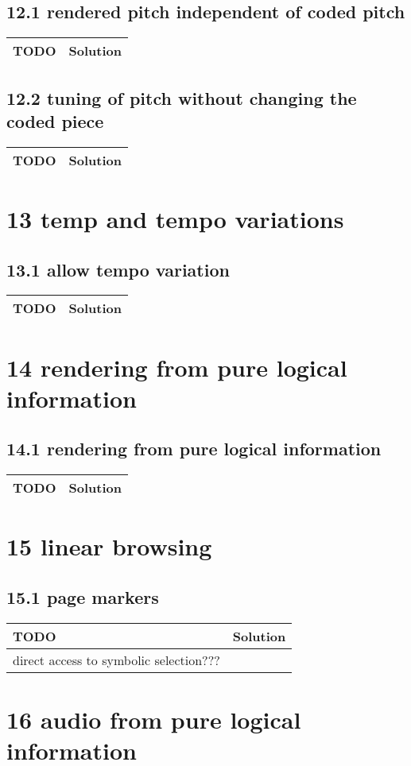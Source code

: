  \subsection*{12.1 rendered pitch independent of coded pitch}
 \begin{tabular}{|p{}|p{}|}
 \hline
 \textbf{TODO} &
 \textbf{Solution} 
\\
 \hline
 \end{tabular} \subsection*{12.2 tuning of pitch without changing the coded piece}
 \begin{tabular}{|p{}|p{}|}
 \hline
 \textbf{TODO} &
 \textbf{Solution} 
\\
 \hline
 \end{tabular} \section*{13 temp and tempo variations}
 \subsection*{13.1 allow tempo variation}
 \begin{tabular}{|p{}|p{}|}
 \hline
 \textbf{TODO} &
 \textbf{Solution} 
\\
 \hline
 \end{tabular} \section*{14 rendering from pure logical information}
 \subsection*{14.1 rendering from pure logical information}
 \begin{tabular}{|p{}|p{}|}
 \hline
 \textbf{TODO} &
 \textbf{Solution} 
\\
 \hline
 \end{tabular} \section*{15 linear browsing}
 \subsection*{15.1 page markers}
 \begin{tabular}{|p{}|p{}|}
 \hline
 \textbf{TODO} &
 \textbf{Solution} 
\\
 \hline
	direct access to symbolic selection??? &
  
\\ 	\hline
 \end{tabular} \section*{16 audio from pure logical information}
